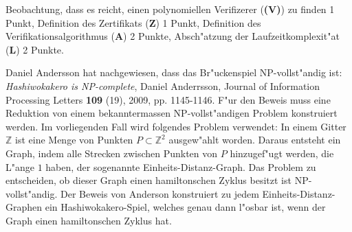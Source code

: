 \begin{bewertung}
Beobachtung, dass es reicht, einen polynomiellen Verifizerer ({\bf (V)})
zu finden 1 Punkt,
Definition des Zertifikats ({\bf Z}) 1 Punkt,
Definition des Verifikationsalgorithmus ({\bf A}) 2 Punkte,
Absch"atzung der Laufzeitkomplexit"at ({\bf L}) 2 Punkte.
\end{bewertung}

\begin{diskussion}
Daniel Andersson hat nachgewiesen, dass das Br"uckenspiel
NP-vollst"andig ist: {\it Hashiwokakero is NP-complete},
Daniel Anderrsson, Journal of Information Processing Letters {\bf 109} (19),
2009, pp. 1145-1146.
F"ur den Beweis muss eine Reduktion von einem bekanntermassen
NP-vollst"andigen Problem konstruiert werden.
Im vorliegenden Fall wird folgendes Problem verwendet:
In einem Gitter $\mathbb Z$ ist eine Menge von Punkten $P\subset \mathbb Z^2$
ausgew"ahlt worden.
Daraus entsteht ein Graph, indem alle Strecken zwischen Punkten von $P$
hinzugef"ugt werden, die L"ange $1$ haben,
der sogenannte Einheits-Distanz-Graph.
Das Problem zu entscheiden,
ob dieser Graph einen hamiltonschen Zyklus besitzt ist NP-vollst"andig.
Der Beweis von Anderson konstruiert zu jedem Einheits-Distanz-Graphen
ein Hashiwokakero-Spiel, welches genau dann l"osbar ist, wenn der
Graph einen hamiltonschen Zyklus hat.
\end{diskussion}

